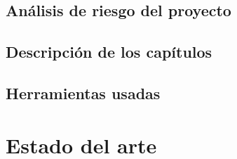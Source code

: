 \documentclass[12pt,a4paper]{article}
\begin{document}
\subsection{Análisis de riesgo del proyecto}                             %
\subsection{Descripción de los capítulos}                                %
\subsection{Herramientas usadas}                                         %



\newpage

\section{Estado del arte}                                                %

                                                      


\end{document}
